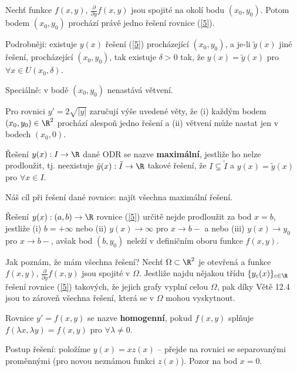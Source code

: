 \begin{veta}[Picard]
Nechť funkce $f(x, y)$, $\frac{\partial}{\partial y} f(x, y)$ jsou spojité na okolí bodu $(x_0, y_0)$. Potom bodem $(x_0, y_0)$ prochází právě jedno řešení rovnice (\ref{5}).

Podrobněji: existuje $y(x)$ řešení (\ref{5}) procházející $(x_0, y_0)$, a je-li $\tilde{y}(x)$ jiné řešení, procházející $(x_0, y_0)$, tak existuje $\delta > 0$ tak, že $y(x) = \tilde{y}(x)$ pro $\forall x \in U(x_0, \delta)$.

Speciálně: v bodě $(x_0, y_0)$ nenastává větvení.
\end{veta}

\begin{priklad}
Pro rovnici $y' = 2\sqrt{|y|}$ zaručují výše uvedené věty, že (i) každým bodem $(x_0, y_0) \in \R^2$ prochází alespoň jedno řešení a (ii) větvení může nastat jen v bodech $(x_0, 0)$.
\end{priklad}

\begin{definice}
Řešení $y(x): I \to \R$ dané ODR se nazve \textbf{maximální}, jestliže ho nelze prodloužit, tj. neexistuje $\tilde{y}(x): \tilde{I} \to \R$ takové řešení, že $I \subsetneq \tilde{I}$ a $y(x) = \tilde{y}(x)$ pro $\forall x \in I$.
\end{definice}

\begin{poznamka}
Náš cíl při řešení dané rovnice: najít všechna maximální řešení.

Řešení $y(x): (a, b) \to \R$ rovnice (\ref{5}) určitě nejde prodloužit za bod $x = b$, jestliže (i) $b = +\infty$ nebo (ii) $y(x) \to \infty$ pro $x \to b-$ a nebo (iii) $y(x) \to y_0$ pro $x \to b-$, avšak bod $(b, y_0)$ neleží v definičním oboru funkce $f(x, y)$.

Jak poznám, že mám všechna řešení? Nechť $\Omega \subset \R^2$ je otevřená a funkce $f(x, y)$, $\frac{\partial}{\partial y} f(x, y)$ jsou spojité v $\Omega$. Jestliže najdu nějakou třídu $\{y_c(x)\}_{c \in \R}$ řešení rovnice (\ref{5}) takových, že jejich grafy vyplní celou $\Omega$, pak díky Větě 12.4 jsou to zároveň všechna řešení, která se v $\Omega$ mohou vyskytnout.
\end{poznamka}

\begin{definice}
Rovnice $y' = f(x, y)$ se nazve \textbf{homogenní}, pokud $f(x, y)$ splňuje $f(\lambda x, \lambda y) = f(x, y)$ pro $\forall \lambda \neq 0$.

Postup řešení: položíme $y(x) = xz(x)$ – přejde na rovnici se separovanými proměnnými (pro novou neznámou funkci $z(x)$). Pozor na bod $x = 0$.
\end{definice}

